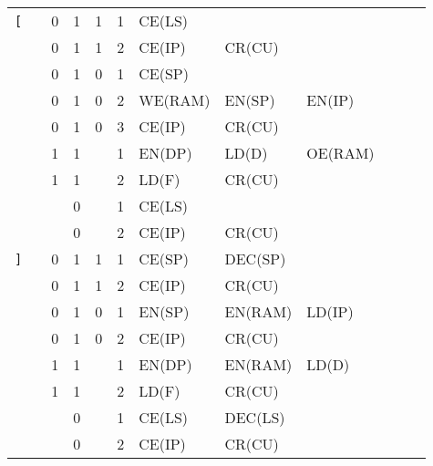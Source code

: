 \begin{landscape}
\begin{longtable}[c] {c|cccc|c|llllll}
    \rowcolor{Gray}  \texttt{[}   &   & 0 & 1     & 1    & 1     & CE(LS)   &          &         &        &        &        \\
    \rowcolor{Gray}               &   & 0 & 1     & 1    & 2     & CE(IP)   & CR(CU)   &         &        &        &        \\      
    \rowcolor{White}              &   & 0 & 1     & 0    & 1     & CE(SP)   &          &         &        &        &        \\
    \rowcolor{White}              &   & 0 & 1     & 0    & 2     & WE(RAM)  & EN(SP)   & EN(IP)  &        &        &        \\
    \rowcolor{White}              &   & 0 & 1     & 0    & 3     & CE(IP)   & CR(CU)   &         &        &        &        \\
    \rowcolor{Gray}               &   & 1 & 1     &      & 1     & EN(DP)   & LD(D)    & OE(RAM) &        &        &        \\
    \rowcolor{Gray}               &   & 1 & 1     &      & 2     & LD(F)    & CR(CU)   &         &        &        &        \\
    \rowcolor{White}              &   &   & 0     &      & 1     & CE(LS)   &          &         &        &        &        \\
    \rowcolor{White}              &   &   & 0     &      & 2     & CE(IP)   & CR(CU)   &         &        &        &        \\ \hline
    
    \rowcolor{White} \texttt{]}   &   & 0 & 1     & 1    & 1     & CE(SP)   & DEC(SP)  &         &        &        &        \\
    \rowcolor{White}              &   & 0 & 1     & 1    & 2     & CE(IP)   & CR(CU)   &         &        &        &        \\
        
    \rowcolor{Gray}               &   & 0 & 1     & 0    & 1     & EN(SP)   & EN(RAM)  & LD(IP)  &        &        &        \\
    \rowcolor{Gray}               &   & 0 & 1     & 0    & 2     & CE(IP)   & CR(CU)   &         &        &        &        \\
    \rowcolor{White}              &   & 1 & 1     &      & 1     & EN(DP)   & EN(RAM)  & LD(D)   &        &        &        \\
    \rowcolor{White}              &   & 1 & 1     &      & 2     & LD(F)    & CR(CU)   &         &        &        &        \\
    \rowcolor{Gray}               &   &   & 0     &      & 1     & CE(LS)   & DEC(LS)  &         &        &        &        \\ 
    \rowcolor{Gray}               &   &   & 0     &      & 2     & CE(IP)   & CR(CU)   &         &        &        &        \\ \hline
    

\end{longtable}
\end{landscape}
